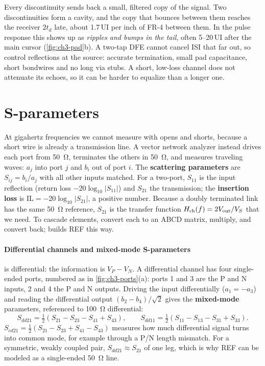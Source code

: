 \begin{insight}
Every discontinuity sends back a small, filtered copy of the signal. Two discontinuities form a cavity, and the copy that bounces between them reaches the receiver $2t_d$ late, about 1.7\,UI per inch of FR-4 between them. In the pulse response this shows up as \emph{ripples and bumps in the tail}, often 5--20\,UI after the main cursor (\cref{fig:ch3-pad}b). A two-tap DFE cannot cancel ISI that far out, so control reflections at the source: accurate termination, small pad capacitance, short bondwires and no long via stubs. A short, low-loss channel does not attenuate its echoes, so it can be harder to equalize than a longer one.
\end{insight}

\section{S-parameters}\label{sec:sparams}

At gigahertz frequencies we cannot measure with opens and shorts, because a short wire is already a transmission line. A vector network analyzer instead drives each port from \qty{50}{\ohm}, terminates the others in \qty{50}{\ohm}, and measures traveling waves: $a_j$ into port $j$ and $b_i$ out of port $i$. The \textbf{scattering parameters} are $S_{ij} = b_i/a_j$ with all other inputs matched. For a two-port, $S_{11}$ is the input reflection (return loss $-20\log_{10}\lvert S_{11}\rvert$) and $S_{21}$ the transmission; the \textbf{insertion loss} is $\mathrm{IL} = -20\log_{10}\lvert S_{21}\rvert$, a positive number. Because a doubly terminated link has the same \qty{50}{\ohm} reference, $S_{21}$ is the transfer function $H_\mathrm{ch}(f) = 2V_\mathrm{out}/V_S$ that we need. To cascade elements, convert each to an ABCD matrix, multiply, and convert back;  builds REF this way.

\paragraph{Differential channels and mixed-mode S-parameters}
\OS{} is differential: the information is $V_P - V_N$. A differential channel has four single-ended ports, numbered as in \cref{fig:ch3-ports}(a): ports 1 and 3 are the P and N inputs, 2 and 4 the P and N outputs. Driving the input differentially ($a_1 = -a_3$) and reading the differential output $(b_2 - b_4)/\sqrt2$ gives the \textbf{mixed-mode} parameters, referenced to \qty{100}{\ohm} differential:
\begin{equation}
  S_{dd21} = \tfrac12\left(S_{21} - S_{23} - S_{41} + S_{43}\right), \qquad
  S_{dd11} = \tfrac12\left(S_{11} - S_{13} - S_{31} + S_{33}\right).
  \label{eq:ch3-sdd}
\end{equation}
$S_{cd21} = \tfrac12(S_{21} - S_{23} + S_{41} - S_{43})$ measures how much differential signal turns into common mode, for example through a P/N length mismatch. For a symmetric, weakly coupled pair, $S_{dd21}\approx S_{21}$ of one leg, which is why REF can be modeled as a single-ended \qty{50}{\ohm} line.

